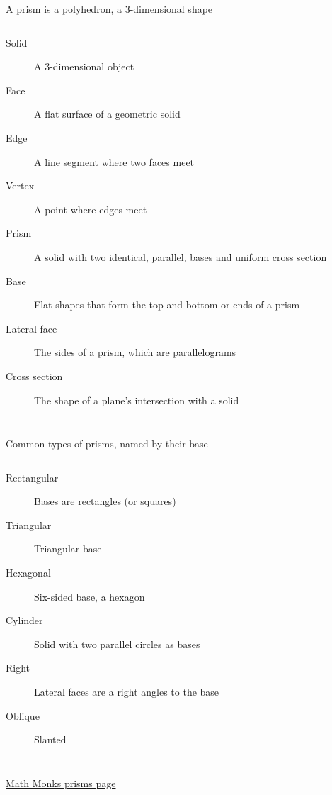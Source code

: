 \documentclass[onlytextwidth, aspectratio=169]{beamer}
\begin{document}
\begin{frame}{A prism is a polyhedron, a 3-dimensional shape}
    \begin{columns}
      \begin{description}
        \item[Solid] A 3-dimensional object
        \item[Face] A flat surface of a geometric solid
        \item[Edge] A line segment where two faces meet
        \item[Vertex] A point where edges meet 
        \item[Prism] A solid with two identical, parallel, bases and uniform cross section
        \item[Base] Flat shapes that form the top and bottom or ends of a prism
        \item[Lateral face] The sides of a prism, which are parallelograms
        \item[Cross section] The shape of a plane's intersection with a solid
      \end{description}
    \end{columns} \vspace{0.5cm}
  \end{frame}

\begin{frame}{Common types of prisms, named by their base}
  \begin{columns}
    \begin{description}
      \item[Rectangular] Bases are rectangles (or squares)
      \item[Triangular] Triangular base
      \item[Hexagonal] Six-sided base, a hexagon
      \item[Cylinder] Solid with two parallel circles as bases 
      \item[Right] Lateral faces are a right angles to the base
      \item[Oblique] Slanted
    \end{description}
  \end{columns} \vspace{0.5cm}
  \href{https://mathmonks.com/prism}{Math Monks prisms page}
\end{frame}
\end{document}
